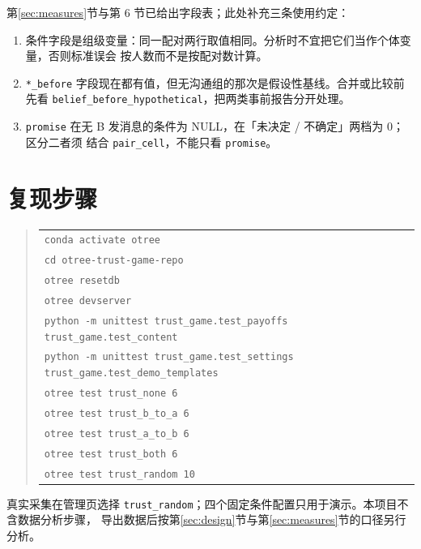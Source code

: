 \documentclass[10pt,a4paper]{ctexart}
\newcommand{\code}[1]{\texttt{#1}}
\begin{document}
第\ref{sec:measures}节与第 6 节已给出字段表；此处补充三条使用约定：

\begin{enumerate}
  \item 条件字段是组级变量：同一配对两行取值相同。分析时不宜把它们当作个体变量，否则标准误会
        按人数而不是按配对数计算。
  \item \code{*\_before} 字段现在都有值，但无沟通组的那次是假设性基线。合并或比较前先看
        \code{belief\_\allowbreak before\_\allowbreak hypothetical}，把两类事前报告分开处理。
  \item \code{promise} 在无 B 发消息的条件为 NULL，在「未决定 / 不确定」两档为 0；区分二者须
        结合 \code{pair\_cell}，不能只看 \code{promise}。
\end{enumerate}

\section{复现步骤}

\begin{quote}\small
\begin{tabular}{l}
\code{conda activate otree} \\
\code{cd otree-trust-game-repo} \\
\code{otree resetdb} \\
\code{otree devserver} \\
\code{python -m unittest trust\_game.test\_payoffs trust\_game.test\_content} \\
\code{python -m unittest trust\_game.test\_settings trust\_game.test\_demo\_templates} \\
\code{otree test trust\_none 6} \\
\code{otree test trust\_b\_to\_a 6} \\
\code{otree test trust\_a\_to\_b 6} \\
\code{otree test trust\_both 6} \\
\code{otree test trust\_random 10} \\
\end{tabular}
\end{quote}

真实采集在管理页选择 \code{trust\_random}；四个固定条件配置只用于演示。本项目不含数据分析步骤，
导出数据后按第\ref{sec:design}节与第\ref{sec:measures}节的口径另行分析。
\end{document}
